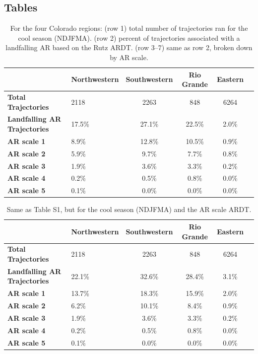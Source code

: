 \documentclass[jgrga]{agutexSI2019}
\begin{document}
\begin{article}
\section{Tables}
\begin{table}
\caption{For the four Colorado regions: (row 1) total number of trajectories ran for the cool season (NDJFMA).
            (row 2) percent of trajectories associated with a landfalling AR based on the 
            Rutz ARDT. 
            (row 3--7) same as row 2, broken down by AR scale.}
\label{table:NDJFMAar}
\begin{tabular}{lp{2cm}cccc}
\toprule
 & Northwestern & Southwestern & Rio Grande & Eastern \\
\midrule
\textbf{Total Trajectories} & 2118 & 2263 & 848 & 6264 \\
\textbf{Landfalling AR Trajectories} & 17.5\% & 27.1\% & 22.5\% & 2.0\% \\
\textbf{AR scale 1} & 8.9\% & 12.8\% & 10.5\% & 0.9\% \\
\textbf{AR scale 2} & 5.9\% & 9.7\% & 7.7\% & 0.8\% \\
\textbf{AR scale 3} & 1.9\% & 3.6\% & 3.3\% & 0.2\% \\
\textbf{AR scale 4} & 0.2\% & 0.5\% & 0.8\% & 0.0\% \\
\textbf{AR scale 5} & 0.1\% & 0.0\% & 0.0\% & 0.0\% \\
\bottomrule
\end{tabular}
\end{table}

\begin{table}
\caption{ Same as Table S1, but for the cool season (NDJFMA) and the AR scale ARDT.}
\label{table:NDJFMAar_scale}
\begin{tabular}{lp{2cm}cccc}
\toprule
 & Northwestern & Southwestern & Rio Grande & Eastern \\
\midrule
\textbf{Total Trajectories} & 2118 & 2263 & 848 & 6264 \\
\textbf{Landfalling AR Trajectories} & 22.1\% & 32.6\% & 28.4\% & 3.1\% \\
\textbf{AR scale 1} & 13.7\% & 18.3\% & 15.9\% & 2.0\% \\
\textbf{AR scale 2} & 6.2\% & 10.1\% & 8.4\% & 0.9\% \\
\textbf{AR scale 3} & 1.9\% & 3.6\% & 3.3\% & 0.2\% \\
\textbf{AR scale 4} & 0.2\% & 0.5\% & 0.8\% & 0.0\% \\
\textbf{AR scale 5} & 0.1\% & 0.0\% & 0.0\% & 0.0\% \\
\bottomrule
\end{tabular}
\end{table}


\end{article}
\end{document}
